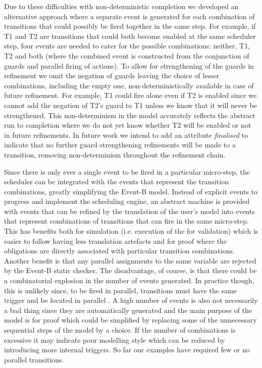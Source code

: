 Due to these difficulties with non-deterministic completion we developed an alternative approach where a separate event is generated for each combination of transitions that could possibly be fired together in the same step. 
For example, if T1 and T2 are transitions that could both become enabled at the same scheduler step, four events are needed to cater for the possible combinations: neither, T1, T2 and both (where the combined event is constructed from the conjunction of guards and parallel firing of actions). 
To allow for strengthening of the guards  in refinement we omit the negation of guards
leaving the choice of lesser combinations, including the empty one, non-deterministically available in case of future refinement.
For example, T1 could fire alone even if T2 is enabled since we cannot add the negation of T2's guard to T1 unless we know that it will never be strengthened. 
This non-determinism in the model accurately reflects the abstract run to completion where we do not yet know whether T2 will be enabled or not in future refinements. 
In future work we intend to add an attribute \emph{finalised} to indicate that no further guard strengthening refinements will be made to a transition, removing non-determinism throughout the refinement chain.

Since there is only ever a single event to be fired in a particular micro-step, the scheduler can be integrated with the events that represent the transition combinations, greatly simplifying the Event-B model.
Instead of explicit events to progress and implement the scheduling engine, an abstract machine is provided with events that can be refined by the translation of the user's \SCXML model into events that represent combinations of transitions that can fire in the same micro-step.
This has benefits both for simulation (i.e. execution of the \statechart for validation) which is easier to follow having less translation artefacts and for proof where the obligations are directly associated with particular transition combinations. 
Another benefit is that any parallel assignments to the same variable are rejected by the Event-B static checker.
The disadvantage, of course, is that there could be a combinatorial explosion in the number of events generated.
In practice though, this is unlikely since, to be fired in parallel, transitions must have the same trigger and be located in parallel \statecharts.
A high number of events is also not necessarily a bad thing since they are automatically generated and the main purpose of the \EventB model is for proof which could be simplified by replacing some of the unnecessary sequential steps of the model by a choice.
If the number of combinations is excessive it may indicate poor modelling style which can be reduced by introducing more internal triggers.
So far our examples have required few or no parallel transitions.

